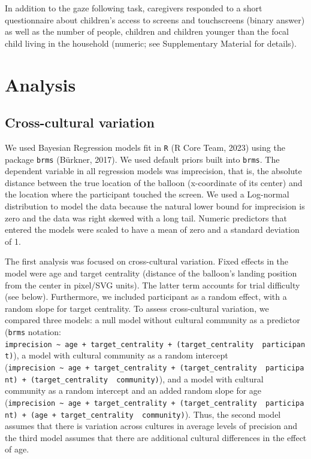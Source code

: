 \documentclass[
  man,floatsintext]{apa7}
\begin{document}
In addition to the gaze following task, caregivers responded to a short questionnaire about children's access to screens and touchscreens (binary answer) as well as the number of people, children and children younger than the focal child living in the household (numeric; see Supplementary Material for details).

\section{Analysis}\label{analysis}

\subsection{Cross-cultural variation}\label{cross-cultural-variation}

We used Bayesian Regression models fit in \texttt{R} (R Core Team, 2023) using the package \texttt{brms} (Bürkner, 2017). We used default priors built into \texttt{brms}. The dependent variable in all regression models was imprecision, that is, the absolute distance between the true location of the balloon (x-coordinate of its center) and the location where the participant touched the screen. We used a Log-normal distribution to model the data because the natural lower bound for imprecision is zero and the data was right skewed with a long tail. Numeric predictors that entered the models were scaled to have a mean of zero and a standard deviation of 1.

The first analysis was focused on cross-cultural variation. Fixed effects in the model were age and target centrality (distance of the balloon's landing position from the center in pixel/SVG units). The latter term accounts for trial difficulty (see below). Furthermore, we included participant as a random effect, with a random slope for target centrality. To assess cross-cultural variation, we compared three models: a null model without cultural community as a predictor (\texttt{brms} notation: \texttt{imprecision\ \textasciitilde{}\ age\ +\ target\_centrality\ +\ (target\_centrality\ \textbar{}\ participant)}), a model with cultural community as a random intercept (\texttt{imprecision\ \textasciitilde{}\ age\ +\ target\_centrality\ +\ (target\_centrality\ \textbar{}\ participant)\ +\ (target\_centrality\ \textbar{}\ community)}), and a model with cultural community as a random intercept and an added random slope for age (\texttt{imprecision\ \textasciitilde{}\ age\ +\ target\_centrality\ +\ (target\_centrality\ \textbar{}\ participant)\ +\ (age\ +\ target\_centrality\ \textbar{}\ community)}). Thus, the second model assumes that there is variation across cultures in average levels of precision and the third model assumes that there are additional cultural differences in the effect of age.
\end{document}
